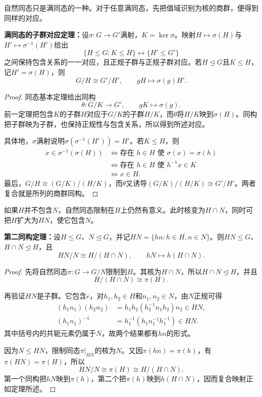 自然同态只是满同态的一种。对于任意满同态，先把值域识别为核的商群，便得到同样的对应。

\begin{theorem}\label{p2:correspondence-onto}
\textbf{满同态的子群对应定理：}设$\sigma:G\to G'$满射，$K=\ker\sigma$。映射$H\mapsto\sigma(H)$与$H'\mapsto\sigma^{-1}(H')$给出
\[
\{H\leq G:K\leq H\}\longleftrightarrow\{H'\leq G'\}
\]
之间保持包含关系的一一对应，且正规子群与正规子群对应。若$H\trianglelefteq G$且$K\leq H$，记$H'=\sigma(H)$，则
\[
G/H\cong G'/H',\qquad gH\longmapsto\sigma(g)H'.
\]
\end{theorem}
\begin{proof}
同态基本定理给出同构
\[
\theta:G/K\longrightarrow G',\qquad gK\longmapsto\sigma(g).
\]
前一定理把包含$K$的子群$H$对应于$G/K$的子群$H/K$，而$\theta$将$H/K$映到$\sigma(H)$。同构把子群映为子群，也保持正规性与包含关系，所以得到所述对应。

具体地，$\sigma$满射说明$\sigma(\sigma^{-1}(H'))=H'$。若$K\leq H$，则
\begin{align*}
x\in\sigma^{-1}(\sigma(H))
&\iff\text{存在 }h\in H\text{ 使 }\sigma(x)=\sigma(h)\\
&\iff\text{存在 }h\in H\text{ 使 }h^{-1}x\in K\\
&\iff x\in H.
\end{align*}
最后，$G/H\cong(G/K)/(H/K)$，而$\theta$又诱导$(G/K)/(H/K)\cong G'/H'$。两者复合就是所列的商群同构。
\end{proof}

如果$H$并不包含$N$，自然同态限制在$H$上仍然有意义。此时核变为$H\cap N$，同时可把$H$扩大为$HN$，使它包含$N$。

\begin{theorem}\label{p2:second-iso}
\textbf{第二同构定理：}设$H\leq G$、$N\trianglelefteq G$，并记$HN=\{hn:h\in H,n\in N\}$。则$HN\leq G$、$H\cap N\trianglelefteq H$，且
\[
HN/N\cong H/(H\cap N),\qquad hN\longmapsto h(H\cap N).
\]
\end{theorem}
\begin{proof}
先将自然同态$\pi:G\to G/N$限制到$H$。其核为$H\cap N$，所以$H\cap N\trianglelefteq H$，并且
\[
H/(H\cap N)\cong\pi(H).
\]

再验证$HN$是子群。它包含$e$，对$h_1,h_2\in H$和$n_1,n_2\in N$，由$N$正规可得
\begin{align*}
(h_1n_1)(h_2n_2)
&=h_1h_2(h_2^{-1}n_1h_2)n_2\in HN,\\
(h_1n_1)^{-1}
&=h_1^{-1}(h_1n_1^{-1}h_1^{-1})\in HN.
\end{align*}
其中括号内的共轭元素仍属于$N$，故两个结果都有$hn$的形式。

因为$N\leq HN$，限制同态$\pi|_{HN}$的核为$N$。又因$\pi(hn)=\pi(h)$，有$\pi(HN)=\pi(H)$，所以
\[
HN/N\cong\pi(H)\cong H/(H\cap N).
\]
第一个同构把$hN$映到$\pi(h)$，第二个把$\pi(h)$映到$h(H\cap N)$，因而复合映射正如定理所述。
\end{proof}

